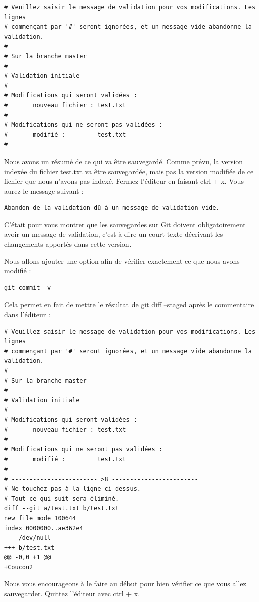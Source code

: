 \documentclass{article}
\begin{document}
\begin{verbatim}
# Veuillez saisir le message de validation pour vos modifications. Les lignes
# commençant par '#' seront ignorées, et un message vide abandonne la validation.
#
# Sur la branche master
#
# Validation initiale
#
# Modifications qui seront validées :
#       nouveau fichier : test.txt
#
# Modifications qui ne seront pas validées :
#       modifié :         test.txt
#
\end{verbatim}
Nous avons un résumé de ce qui va être sauvegardé. Comme prévu, la version indexée du fichier {\color{blue}test.txt} va être sauvegardée, mais pas la version modifiée de ce fichier que nous n'avons pas indexé. Fermez l'éditeur en faisant {\color{blue}ctrl + x}. Vous aurez le message suivant :
\begin{verbatim}
Abandon de la validation dû à un message de validation vide.
\end{verbatim}
C'était pour vous montrer que les sauvegardes sur {\color{blue}Git} doivent obligatoirement avoir un message de validation, c'est-à-dire un court texte décrivant les changements apportés dans cette version.

Nous allons ajouter une option afin de vérifier exactement ce que nous avons modifié :

\begin{verbatim}
git commit -v
\end{verbatim}

Cela permet en fait de mettre le résultat de {\color{blue}git diff --staged} après le commentaire dans l'éditeur :
\begin{verbatim}
# Veuillez saisir le message de validation pour vos modifications. Les lignes
# commençant par '#' seront ignorées, et un message vide abandonne la validation.
#
# Sur la branche master
#
# Validation initiale
#
# Modifications qui seront validées :
#       nouveau fichier : test.txt
#
# Modifications qui ne seront pas validées :
#       modifié :         test.txt
#
# ------------------------ >8 ------------------------
# Ne touchez pas à la ligne ci-dessus.
# Tout ce qui suit sera éliminé.
diff --git a/test.txt b/test.txt
new file mode 100644
index 0000000..ae362e4
--- /dev/null
+++ b/test.txt
@@ -0,0 +1 @@
+Coucou2

\end{verbatim}
Nous vous encourageons à le faire au début pour bien vérifier ce que vous allez sauvegarder. Quittez l'éditeur avec {\color{blue}ctrl + x}.
\end{document}
